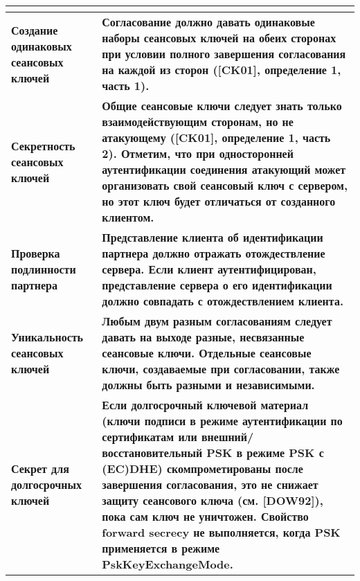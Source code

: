    
    
    
    \begin{table}[h!]
    	\begin{center}
    		\caption{}
    		\label{tbl:level_agreed}
    		\begin{tabular}{|p{6cm}|p{10cm}|}
    			\hline \textbf{} & \textbf{}  \\
    			\hline \textbf{Создание одинаковых сеансовых ключей} & \textbf{Согласование должно давать одинаковые наборы сеансовых ключей на обеих сторонах при условии полного завершения согласования на каждой из сторон ([CK01], определение 1, часть 1).} \\
    			\hline \textbf{Секретность сеансовых ключей} & \textbf{Общие сеансовые ключи следует знать только взаимодействующим сторонам, но не атакующему ([CK01], определение 1, часть 2). Отметим, что при односторонней аутентификации соединения атакующий может организовать свой сеансовый ключ с сервером, но этот ключ будет отличаться от созданного клиентом.} \\
    			\hline \textbf{Проверка подлинности партнера} & \textbf{Представление клиента об идентификации партнера должно отражать отождествление сервера. Если клиент аутентифицирован, представление сервера о его идентификации должно совпадать с отождествлением клиента.} \\
    			\hline \textbf{Уникальность сеансовых ключей} & \textbf{Любым двум разным согласованиям следует давать на выходе разные, несвязанные сеансовые ключи. Отдельные сеансовые ключи, создаваемые при согласовании, также должны быть разными и независимыми.} \\
    			
    			\hline \textbf{Секрет для долгосрочных ключей} & \textbf{Если долгосрочный ключевой материал (ключи подписи в режиме аутентификации по сертификатам или внешний/восстановительный PSK в режиме PSK с (EC)DHE) скомпрометированы после завершения согласования, это не снижает защиту сеансового ключа (см. [DOW92]), пока сам ключ не уничтожен. Свойство forward secrecy не выполняется, когда PSK применяется в режиме %
    				PskKeyExchangeMode.} \\
    			
    			\hline
    		\end{tabular}
    	\end{center} 		
    	
    \end{table}
    
